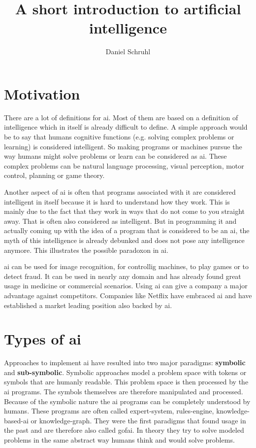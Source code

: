 \documentclass[jou,apacite]{apa6}
\title{A short introduction to artificial intelligence}
\author{Daniel Schruhl}
\affiliation{ThoughtWorks}
\begin{document}
\maketitle    
                        
\section{Motivation}
There are a lot of definitions for \gls{ai}. Most of them are based on a definition of intelligence which in itself is already difficult to define. A simple approach would be to say that humans cognitive functions (e.g. solving complex problems or learning) is considered intelligent. So making programs or machines pursue the way humans might solve problems or learn can be considered as \gls{ai}. These complex problems can be natural language processing, visual perception, motor control, planning or game theory.

Another aspect of \gls{ai} is often that programs associated with it are considered intelligent in itself because it is hard to understand how they work. This is mainly due to the fact that they work in ways that do not come to you straight away. That is often also considered as intelligent.
But in programming it and actually coming up with the idea of a program that is considered to be an \gls{ai}, the myth of this intelligence is already debunked and does not pose any intelligence anymore. This illustrates the possible paradoxon in \gls{ai}.

\gls{ai} can be used for image recognition, for controllig machines, to play games or to detect fraud. It can be used in nearly any domain and has already found great usage in medicine or commercial scenarios. Using \gls{ai} can give a company a major advantage against competitors. Companies like Netflix have embraced \gls{ai} \cite{Gomez-Uribe2015} and have established a market leading position also backed by \gls{ai}.

\section{Types of \gls{ai}}
Approaches to implement \gls{ai} have resulted into two major paradigms: \textbf{symbolic} and \textbf{sub-symbolic}. Symbolic approaches model a problem space with tokens or symbols that are humanly readable. This problem space is then processed by the \gls{ai} programs. The symbols themselves are therefore manipulated and processed. Because of the symbolic nature the \gls{ai} programs can be completely understood by humans. These programs are often called \gls{expert-system}, \gls{rules-engine}, \gls{knowledge-based-ai} or \gls{knowledge-graph}. They were the first paradigms that found usage in the past and are therefore also called \gls{gofai}. In theory they try to solve modeled problems in the same abstract way humans think and would solve problems.
\end{document}
